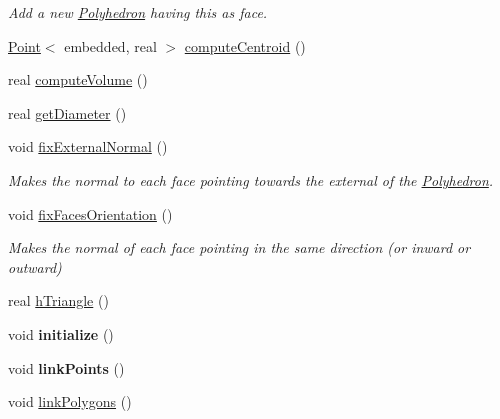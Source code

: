 \begin{DoxyCompactItemize}
\begin{DoxyCompactList}\small\item\em Add a new \hyperlink{class_polyhedron}{Polyhedron} having this as face. \end{DoxyCompactList}\item 
\hyperlink{class_point}{Point}$<$ embedded, real $>$ \hyperlink{class_polyhedron_a8fa603a39f094cba868b90c5087a9f01}{compute\+Centroid} ()
\item 
real \hyperlink{class_polyhedron_abc5b54102a217358bb0f3af69fdaf6f4}{compute\+Volume} ()
\item 
real \hyperlink{class_polyhedron_acec44568add44445f3d87cc1673083aa}{get\+Diameter} ()
\item 
void \hyperlink{class_polyhedron_ace36af0e1b0638f3a0cb6ac2f828cba9}{fix\+External\+Normal} ()\hypertarget{class_polyhedron_ace36af0e1b0638f3a0cb6ac2f828cba9}{}\label{class_polyhedron_ace36af0e1b0638f3a0cb6ac2f828cba9}

\begin{DoxyCompactList}\small\item\em Makes the normal to each face pointing towards the external of the \hyperlink{class_polyhedron}{Polyhedron}. \end{DoxyCompactList}\item 
void \hyperlink{class_polyhedron_ab5a7edbaf82c77541bb7ed67eef1af78}{fix\+Faces\+Orientation} ()\hypertarget{class_polyhedron_ab5a7edbaf82c77541bb7ed67eef1af78}{}\label{class_polyhedron_ab5a7edbaf82c77541bb7ed67eef1af78}

\begin{DoxyCompactList}\small\item\em Makes the normal of each face pointing in the same direction (or inward or outward) \end{DoxyCompactList}\item 
real \hyperlink{class_polyhedron_ae055b1e499fc2ac20f0db25379c30390}{h\+Triangle} ()
\item 
void {\bfseries initialize} ()\hypertarget{class_polyhedron_a9a64a02c8d5d1afd6c5d0ff4d0b6bcb4}{}\label{class_polyhedron_a9a64a02c8d5d1afd6c5d0ff4d0b6bcb4}

\item 
void {\bfseries link\+Points} ()\hypertarget{class_polyhedron_a2f266d7dac199c4ff5ceb7d06b1c4a3d}{}\label{class_polyhedron_a2f266d7dac199c4ff5ceb7d06b1c4a3d}

\item 
void \hyperlink{class_polyhedron_aafd989af8eb6e5728fd2791049100f41}{link\+Polygons} ()\hypertarget{class_polyhedron_aafd989af8eb6e5728fd2791049100f41}{}\label{class_polyhedron_aafd989af8eb6e5728fd2791049100f41}


\end{DoxyCompactItemize}
